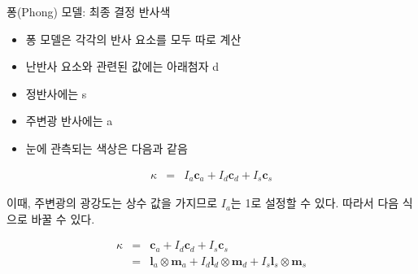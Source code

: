\documentclass{beamer}
\begin{document}
\begin{frame}[fragile]{퐁(Phong) 모델: 최종 결정 반사색}

\begin{itemize}
\item 퐁 모델은 각각의 반사 요소를 모두 따로 계산
\item 난반사 요소와 관련된 값에는 아래첨자 d
\item 정반사에는 s
\item 주변광 반사에는 a
\item 눈에 관측되는 색상은 다음과 같음
\end{itemize}

\begin{eqnarray}
\kappa & = & I_a \mathbf c_a + I_d \mathbf c_d + I_s \mathbf c_s \nonumber
\end{eqnarray}

이때, 주변광의 광강도는 상수 값을 가지므로 $I_a$는 1로 설정할 수 있다. 따라서 다음 식으로 바꿀 수 있다.

\begin{eqnarray} \nonumber
\kappa & = & \mathbf c_a + I_d \mathbf c_d + I_s \mathbf c_s \\ \nonumber 
&  =  & \mathbf l_a \otimes \mathbf m_a + I_d \mathbf l_d \otimes \mathbf m_d + I_s \mathbf l_s \otimes \mathbf m_s \nonumber
\end{eqnarray}

\end{frame}
\end{document}
